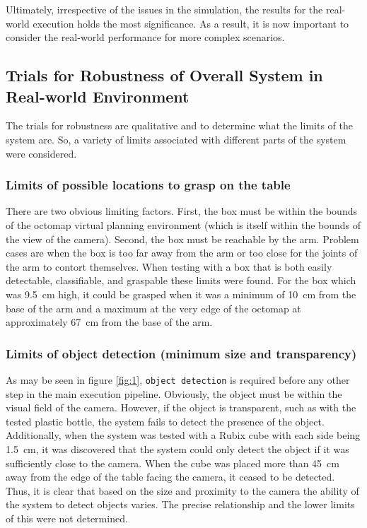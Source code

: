 \documentclass[letterpaper, 10 pt, conference]{conf/ieeeconf}  %
\begin{document}
Ultimately, irrespective of the issues in the simulation, the results for the
real-world execution holds the most significance. As a result, it is now
important to consider the real-world performance for more complex scenarios.

\subsection{Trials for Robustness of Overall System in Real-world Environment}
The trials for robustness are qualitative and to determine what the limits of
the system are. So, a variety of limits associated with different parts of the
system were considered.

\subsubsection{Limits of possible locations to grasp on the table}
There are two obvious limiting factors. First, the box must be within the bounds
of the octomap virtual planning environment (which is itself within the bounds
of the view of the camera). Second, the box must be reachable by the arm.
Problem cases are when the box is too far away from the arm or too close for the
joints of the arm to contort themselves. When testing with a box that is both
easily detectable, classifiable, and graspable these limits were found. For the
box which was \SI{9.5}{\centi\meter} high, it could be grasped when it was a
minimum of \SI{10}{\centi\meter} from the base of the arm and a maximum at the
very edge of the octomap at approximately \SI{67}{\centi\meter} from the base of
the arm.

\subsubsection{Limits of object detection (minimum size and transparency)}
As may be seen in figure \ref{fig:1}, \texttt{object detection} is required
before any other step in the main execution pipeline. Obviously, the object must
be within the visual field of the camera. However, if the object is transparent,
such as with the tested plastic bottle, the system fails to detect the presence
of the object. Additionally, when the system was tested with a Rubix cube with
each side being \SI{1.5}{\centi\meter}, it was discovered that the system could
only detect the object if it was sufficiently close to the camera. When the cube
was placed more than \SI{45}{\centi\meter} away from the edge of the table
facing the camera, it ceased to be detected. Thus, it is clear that based on the
size and proximity to the camera the ability of the system to detect objects
varies. The precise relationship and the lower limits of this were not
determined.
\end{document}
